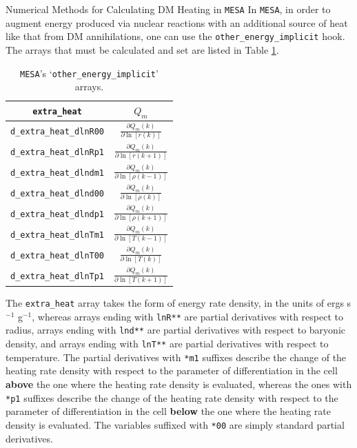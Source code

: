 \documentclass[a4paper,11pt]{article}
\begin{document}
\begin{section}{Numerical Methods for Calculating DM Heating in \texttt{MESA}}
    In \texttt{MESA}, in order to augment energy produced via nuclear reactions with an additional source of heat like that from DM annihilations, one can use the \texttt{other\_energy\_implicit} hook.
    The arrays that must be calculated and set are listed in Table \ref{arrays}.
    \begin{table}
    \begin{center}
    \begin{tabular}{ |c|c| } 
     \hline
     \texttt{extra\_heat} & $Q_m$ \\ 
     \hline
     \texttt{d\_extra\_heat\_dlnR00} & $\frac{\partial Q_{m}(k)}{\partial \ln[r(k)]}$ \\ 
     \hline
     \texttt{d\_extra\_heat\_dlnRp1} & $\frac{\partial Q_{m}(k)}{\partial \ln[r(k+1)]}$ \\ 
     \hline
     \texttt{d\_extra\_heat\_dlndm1} & $\frac{\partial Q_{m}(k)}{\partial \ln[\rho(k-1)]}$  \\ 
     \hline
     \texttt{d\_extra\_heat\_dlnd00} & $\frac{\partial Q_{m}(k)}{\partial \ln[\rho(k)]}$  \\ 
     \hline
     \texttt{d\_extra\_heat\_dlndp1} & $\frac{\partial Q_{m}(k)}{\partial \ln[\rho(k+1)]}$  \\ 
     \hline
     \texttt{d\_extra\_heat\_dlnTm1} & $\frac{\partial Q_{m}(k)}{\partial \ln[T(k-1)]}$  \\ 
     \hline
     \texttt{d\_extra\_heat\_dlnT00} & $\frac{\partial Q_{m}(k)}{\partial \ln[T(k)]}$  \\ 
     \hline
     \texttt{d\_extra\_heat\_dlnTp1} & $\frac{\partial Q_{m}(k)}{\partial \ln[T(k+1)]}$  \\ 
     \hline
    \end{tabular}
    \caption{\texttt{MESA}'s `\texttt{other\_energy\_implicit}' arrays.}
    \label{arrays}
    \end{center}
    \end{table}

    The \texttt{extra\_heat} array takes the form of energy rate density, in the units of ergs s$^{-1}$ g$^{-1}$, whereas arrays ending with \texttt{lnR**} are partial derivatives with respect to radius, arrays ending with \texttt{lnd**} are partial derivatives with respect to baryonic density, and arrays ending with \texttt{lnT**} are partial derivatives with respect to temperature.
    The partial derivatives with \texttt{*m1} suffixes describe the change of the heating rate density with respect to the parameter of differentiation in the cell \textbf{above} the one where the heating rate density is evaluated, whereas the ones with \texttt{*p1} suffixes describe the change of the heating rate density with respect to the parameter of differentiation in the cell \textbf{below} the one where the heating rate density is evaluated.
    The variables suffixed with \texttt{*00} are simply standard partial derivatives.


\end{section}
\end{document}
